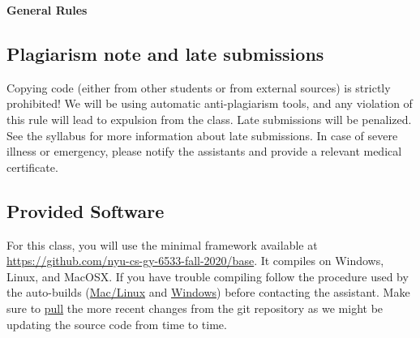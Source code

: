 \documentclass[11pt]{report}
\begin{document}




\hspace{50pt}

\begin{center}

{\Huge \textbf{General Rules}}\\
\vspace{10pt}
\end{center}

\subsection*{Plagiarism note and late submissions}
Copying code (either from other students or from external sources) is strictly prohibited! We will be using automatic anti-plagiarism tools, and any violation of this rule will lead to expulsion from the class. Late submissions will be penalized. See the syllabus for more information about late submissions. In case of severe illness or emergency, please notify the assistants and provide a relevant medical certificate.

\subsection*{Provided Software}
For this class, you will use the minimal framework available at  \href{https://github.com/nyu-cs-gy-6533-fall-2020/base}{https://github.com/nyu-cs-gy-6533-fall-2020/base}. It compiles on Windows, Linux, and MacOSX. If you have trouble compiling follow the procedure used by the auto-builds (\href{https://travis-ci.org/danielepanozzo/cg}{Mac/Linux} and \href{https://ci.appveyor.com/project/danielepanozzo/cg}{Windows}) before contacting the assistant. Make sure to \href{http://git-scm.com/book/en/v2/Git-Basics-Getting-a-Git-Repository}{pull} the more recent changes from the git repository as we might be updating the source code from time to time.
\end{document}
